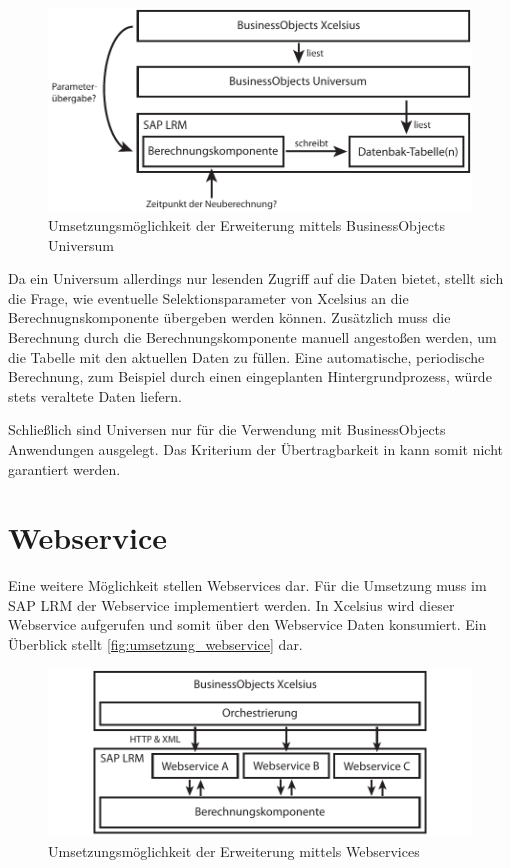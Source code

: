 \begin{onehalfspacing}
\begin{figure}[!ht]
\centering
\setlength{\unitlength}{1mm}
\includegraphics[width=15cm]{images/Abbildung9-Umsetzung-Universum.pdf}
\caption{Umsetzungsmöglichkeit der Erweiterung mittels BusinessObjects Universum \label{fig:umsetzung_universe}}
\end{figure}

Da ein Universum allerdings nur lesenden Zugriff auf die Daten bietet, stellt sich die Frage, wie eventuelle Selektionsparameter von \gls{Xcelsius} an die Berechnugnskomponente übergeben werden können. Zusätzlich muss die Berechnung durch die Berechnungskomponente manuell angestoßen werden, um die Tabelle mit den aktuellen Daten zu füllen. Eine automatische, periodische Berechnung, zum Beispiel durch einen eingeplanten Hintergrundprozess, würde stets veraltete Daten liefern.

Schließlich sind Universen nur für die Verwendung mit BusinessObjects Anwendungen ausgelegt. Das Kriterium der Übertragbarkeit in  kann somit nicht garantiert werden.

\section{Webservice}
Eine weitere Möglichkeit stellen Webservices dar. Für die Umsetzung muss im SAP LRM der Webservice implementiert werden. In \gls{Xcelsius} wird dieser Webservice aufgerufen und somit über den Webservice Daten konsumiert. Ein Überblick stellt \vref{fig:umsetzung_webservice} dar.

\begin{figure}[!ht]
\centering
\setlength{\unitlength}{1mm}
\includegraphics[width=15cm]{images/Abbildung10-Umsetzung-Webservices.pdf}
\caption{Umsetzungsmöglichkeit der Erweiterung mittels Webservices \label{fig:umsetzung_webservice}}
\end{figure} 


\end{onehalfspacing}

